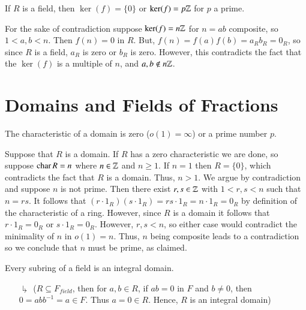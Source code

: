 \documentclass[12pt, a4paper, twoside, openright, titlepage]{book}
\begin{document}
\begin{prop}{}{}
        If $R$ is a field, then $\ker(f) = \{0\}$ or $\ker(f) = p\mathbb Z$ for $p$ a prime.
\end{prop}
\begin{proof*}{}{}
        For the sake of contradiction suppose $\ker(f) = n\mathbb Z$ for $n = ab$ composite, so $1 < a,b < n$. Then $f(n) = 0$ in $R$. But, $f(n) = f(a)f(b) = a_Rb_R = 0_R$, so since $R$ is a field, $a_R$ is zero or $b_R$ is zero. However, this contradicts the fact that the $\ker(f)$ is a multiple of $n$, and $a,b \notin n\mathbb Z$.
\end{proof*}





\section{\textsection Domains and Fields of Fractions}

\begin{prop}{}{}
    The characteristic of a domain is zero ($o(1) = \infty$) or a prime number $p$.
    \begin{proof*}{}{}
        Suppose that $R$ is a domain. If $R$ has a zero characteristic we are done, so suppose $\operatorname{char} R = n$ where $n \in \mathbb Z$ and $n \geq 1$. If $n = 1$ then $R = \{0\}$, which contradicts the fact that $R$ is a domain. Thus, $n > 1$. We argue by contradiction and suppose $n$ is not prime. Then there exist $r,s \in \mathbb Z$ with $1 < r,s < n$ such that $n = rs$. It follows that $(r\cdot 1_R)(s\cdot 1_R) = rs\cdot 1_R = n\cdot 1_R = 0_R$ by definition of the characteristic of a ring. However, since $R$ is a domain it follows that $r\cdot 1_R = 0_R$ or $s \cdot 1_R = 0_R$. However, $r,s < n$, so either case would contradict the minimality of $n$ in $o(1) = n$. Thus, $n$ being composite leads to a contradiction so we conclude that $n$ must be prime, as claimed.
    \end{proof*}
\end{prop}

\begin{rmk}{}{}
    Every subring of a field is an integral domain.
    \begin{enumerate}
        \item[$\drsh$] ($R\subseteq F_{field}$, then for $a,b \in R$, if $ab = 0$ in $F$ and $b \neq 0$, then $0 = abb^{-1} = a \in F$. Thus $a = 0 \in R$. Hence, $R$ is an integral domain)
    \end{enumerate}
\end{rmk}
\end{document}

